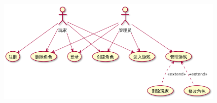 \documentclass{article}
\begin{document}
\begin{figure}[tbp]%
\begin{mdcenter}%

\noindent{}\includegraphics[keepaspectratio=true,width=\dimwidth{1.00}]{./img/1}{}%

\mdhr{}%

\noindent{}%
\end{mdcenter}%
\end{figure}%
\end{document}
